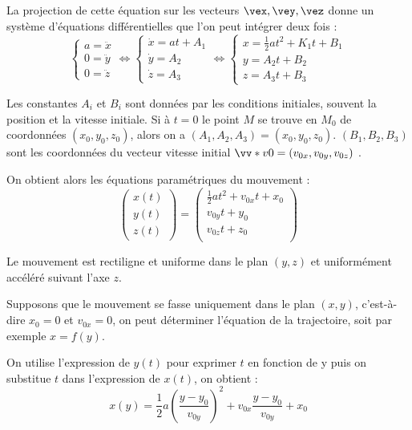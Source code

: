 \documentclass{cours}
\begin{document}
La projection de cette équation sur les vecteurs $\vex, \vey, \vez$ donne un système d'équations différentielles que l'on peut intégrer deux fois :
\begin{equation}
\begin{cases}
  a = \ddot{x}\\
  0 = \ddot{y}\\
  0 = \ddot{z}
\end{cases} \Leftrightarrow
\begin{cases}
  \dot{x} = at+A_1\\
  \dot{y} = A_2\\
  \dot{z} = A_3
\end{cases} \Leftrightarrow
\begin{cases}
  x = \frac{1}{2}at^2+K_1t + B_1\\
  y = A_2t + B_2\\
  z = A_3t + B_3
\end{cases} 
\end{equation}


Les constantes $A_i$ et $B_i$ sont données par les conditions initiales, souvent la position et la vitesse initiale. Si à $t=0$ le point $M$ se trouve en $M_0$ de coordonnées $(x_0, y_0, z_0)$, alors on a $(A_1, A_2, A_3) = (x_0, y_0, z_0)$. $(B_1, B_2, B_3)$ sont les coordonnées du vecteur vitesse initial $\vv*{v}{0}=(v_{0x}, v_{0y}, v_{0z})$ .  

On obtient alors les équations paramétriques du mouvement :
\begin{equation}
\begin{pmatrix}
  x(t)\\y(t)\\z(t)
\end{pmatrix}
=
\begin{pmatrix}
  \frac{1}{2}at^2 + v_{0x}t + x_0\\
  v_{0y}t + y_0\\
  v_{0z}t + z_0\\
\end{pmatrix}
\end{equation}


Le mouvement est rectiligne et uniforme dans le plan $(y, z)$ et uniformément accéléré suivant l'axe $z$. 

Supposons que le mouvement se fasse uniquement dans le plan $(x, y)$, c'est-à-dire $x_0=0$ et $v_{0x}=0$, on peut déterminer l'équation de la trajectoire, soit par exemple $x=f(y)$.

On utilise l'expression de $y(t)$ pour exprimer $t$ en fonction de y puis on substitue $t$ dans l'expression de $x(t)$, on obtient :
\begin{equation}
x(y) = \frac{1}{2}a\left( \frac{y-y_0}{v_{0y}}\right)^2+v_{0x} \frac{y-y_0}{v_{0y}} + x_0  
\end{equation}
\end{document}
